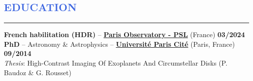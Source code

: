 \documentclass[11pt]{article}
\begin{document}


%


\vspace{-0.25cm}
\textcolor{RoyalBlue}{\section{\large EDUCATION}
\vspace{-0.35cm}\hrule}
\vspace{0.4cm}

\textbf{French habilitation (HDR)} --
\href{http://www.obspm.fr}{\textbf{Paris Observatory - PSL}} (France)
\hfill  { \bf 03/2024}\\


\textbf{PhD} -- Astronomy \& Astrophysics --
\href{https://www.univ-paris-diderot.fr/}{\textbf{Université Paris Cité}} (Paris, France)
\hfill  { \bf 09/2014}\\
{\small
\null \hspace{0.6cm}
{\it Thesis}: High-Contrast Imaging Of Exoplanets And Circumstellar Disks (P. Baudoz \& G. Rousset)}\\
\end{document}
